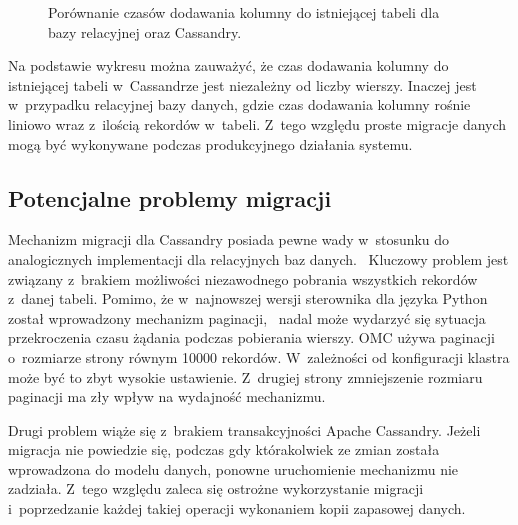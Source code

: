 \begin{figure}[ht!]
	\centering

	\caption{Porównanie czasów dodawania kolumny do istniejącej tabeli dla bazy relacyjnej oraz Cassandry.}
	\label{fig:simple_migration_performance_test}
\end{figure}

Na podstawie wykresu można zauważyć, że czas dodawania kolumny do istniejącej tabeli w~Cassandrze jest niezależny od liczby wierszy. Inaczej jest w~przypadku relacyjnej bazy danych, gdzie czas dodawania kolumny rośnie liniowo wraz z~ilością rekordów w~tabeli. Z~tego względu proste migracje danych mogą być wykonywane podczas produkcyjnego działania systemu. 

\subsection{Potencjalne problemy migracji}

Mechanizm migracji dla Cassandry posiada pewne wady w~stosunku do analogicznych implementacji dla relacyjnych baz danych.~\cite{django_migrations} Kluczowy problem jest związany z~brakiem możliwości niezawodnego pobrania  wszystkich rekordów z~danej tabeli. Pomimo, że w~najnowszej wersji sterownika dla języka Python został wprowadzony mechanizm paginacji,~\cite{python_driver_pagination} nadal może wydarzyć się sytuacja przekroczenia czasu żądania podczas pobierania wierszy. OMC używa paginacji o~rozmiarze strony równym 10000 rekordów. W~zależności od konfiguracji klastra może być to zbyt wysokie ustawienie. Z~drugiej strony zmniejszenie rozmiaru paginacji ma zły wpływ na wydajność mechanizmu.

Drugi problem wiąże się z~brakiem transakcyjności Apache Cassandry. Jeżeli migracja nie powiedzie się, podczas gdy którakolwiek ze zmian została wprowadzona do modelu danych, ponowne uruchomienie mechanizmu nie zadziała. Z~tego względu zaleca się ostrożne wykorzystanie migracji i~poprzedzanie każdej takiej operacji wykonaniem kopii zapasowej danych. 

